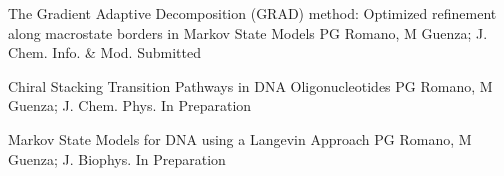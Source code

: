 
%
%

\begin{cvpapers}
  \cvpaper
    {The Gradient Adaptive Decomposition (GRAD) method: Optimized refinement along macrostate borders in Markov State Models}
    {PG Romano, M Guenza; J. Chem. Info. \& Mod.}
    {Submitted}
    {}

  \cvpaper
    {Chiral Stacking Transition Pathways in DNA Oligonucleotides}
    {PG Romano, M Guenza; J. Chem. Phys.}
    {In Preparation}
    {}

  \cvpaper
    {Markov State Models for DNA using a Langevin Approach}
    {PG Romano, M Guenza; J. Biophys.}
    {In Preparation}
    {}
\end{cvpapers}
